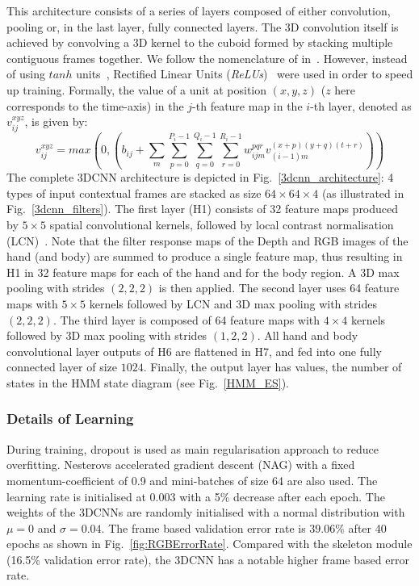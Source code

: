 This  architecture consists of a series of layers composed of either convolution, pooling or, in the last layer, fully connected layers.
The 3D convolution itself is achieved by convolving a 3D kernel to the cuboid formed by stacking multiple contiguous frames together. 
We follow the nomenclature of in~\cite{ji20133d}.
However, instead of using $tanh$ units~\cite{ji20133d},  Rectified Linear Units (\emph{ReLUs})~\cite{krizhevsky2012imagenet} 
were used in order to speed up training.
Formally, the value of a unit at position $(x, y, z)$ ($z$ here corresponds to the time-axis) in the $j$-th feature map in the $i$-th layer, denoted as $v^{xyz}_{ij}$, is given by:
\begin{equation}
v^{xyz}_{ij} =  max( 0,  ( b_{ij} + \sum_m \sum_{p=0}^{P_i - 1} \sum_{q=0}^{Q_i -1 } \sum_{r=0}^{R_i -1} w^{pqr}_{ijm} v^{(x+p)(y+q)(t+r)}_{(i-1)m} ))
\label{ReLU}
\end{equation}
%
The complete 3DCNN architecture is depicted in Fig.~\ref{3dcnn_architecture}:
4 types of input contextual frames are stacked as size $64\times64\times4$ (as illustrated in Fig.~\ref{3dcnn_filters}).
%
The first layer (H1) consists of 32 feature maps produced by $5\times5$ spatial convolutional kernels,
followed by local contrast normalisation (LCN)~\cite{jarrett2009best}.
%
Note that the filter response maps of the Depth and RGB images of the hand (and body) are summed to produce a single feature map,
thus resulting in H1 in 32 feature maps for each of the hand and for the body region.
%
A 3D max pooling with strides $(2,2,2)$ is then applied.
%
The second layer uses 64 feature maps with $5\times5$ kernels followed by LCN and 3D max pooling with strides $(2,2,2)$.
The third layer is composed of 64 feature maps with $4\times4$ kernels followed by 3D max pooling with strides $(1,2,2)$.
All hand and body convolutional layer outputs of H6 are flattened in H7, and fed into one fully connected layer of size $1024$.
%
Finally, the output layer has \numberhiddenstate values, the number of states in the HMM state diagram (see Fig.~\ref{HMM_ES}).




\subsubsection{Details of Learning}
During training, dropout \cite{hinton2012improving} is used as main regularisation approach to reduce overfitting.
Nesterovs accelerated gradient descent (NAG) \cite{sutskever2013importance} with a fixed momentum-coefficient of 0.9 and mini-batches of size 64 are also used.
The learning rate is initialised at 0.003 with a 5\% decrease after each epoch. The weights of the 3DCNNs are randomly initialised with a normal distribution with $\mu = 0$ and $\sigma = 0.04$.
The frame based validation error rate is $39.06\%$ after 40 epochs as shown in Fig.~\ref{fig:RGBErrorRate}.
Compared with the skeleton module (16.5\% validation error rate), the 3DCNN has a notable higher frame based error rate.


